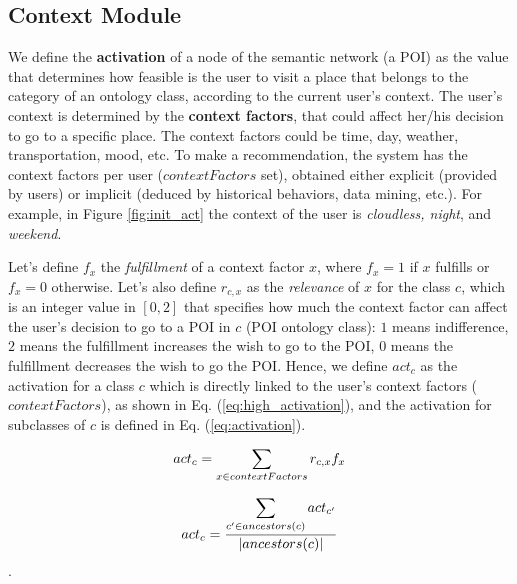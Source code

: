 \subsection{Context Module}
We define the \textbf{activation} of a node of the semantic network (a POI) as the value that determines how feasible 
is the user to visit a place that belongs to the category of  an 
ontology class, according to the current user's context.
The user's context is determined by the \textbf{context factors}, 
that could affect her/his  decision to go to a specific place. The context factors could be time, day, weather, transportation, mood, etc. To make a recommendation, the system has the
context factors per user ($contextFactors$ set), obtained either explicit (provided by users) or implicit (deduced by historical behaviors, data mining, etc.).  For example, in Figure \ref{fig:init_act} the context of the user is
\textit{cloudless, night}, and \textit{weekend}.

Let's define $f_x$ the \textit{fulfillment} of a context factor 
$x$, where $f_x = 1$ if $x$ fulfills or $f_x = 0$ otherwise. Let's also define $r_{c,x}$ as the \textit{relevance} of $x$ for the class $c$, which is an integer value in $[0, 2]$ that specifies how much the context factor %
can affect the user's decision to go to a POI in $c$ (POI ontology class):
$1$ means indifference, 
$2$ means the fulfillment increases the wish to go to the POI,
$0$ means the fulfillment decreases the wish to go the POI. Hence, we define $act_c$ as the activation for a class $c$ which is directly linked to the user's context factors 
($contextFactors$), as shown in Eq. (\ref{eq:high_activation}), and the activation for subclasses of $c$
is defined in Eq. (\ref{eq:activation}).

\vspace{-0.2cm}
\begin{equation} \label{eq:high_activation}
\footnotesize{    act_c = \sum_{x \in contextFactors} r_{c,x} f_x}
\end{equation}


\begin{equation} \label{eq:activation}
\footnotesize{
    act_c = \frac{\displaystyle \sum_{c' \in ancestors(c)} act_{c'}}{|ancestors(c)|}
    }
\end{equation}.

